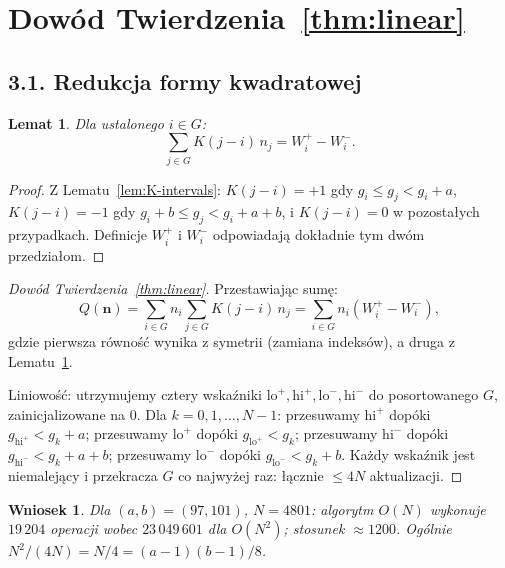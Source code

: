 \documentclass[11pt,a4paper]{amsart}
\theoremstyle{plain}
\newtheorem{lemma}[theorem]{Lemat}
\newtheorem{corollary}[theorem]{Wniosek}
\theoremstyle{definition}
\theoremstyle{remark}
\begin{document}
\section{Dowód Twierdzenia~\ref{thm:linear}}
\label{sec:proof-linear}

\subsection*{3.1. Redukcja formy kwadratowej}

\begin{lemma}
\label{lem:inner-sum}
Dla ustalonego $i \in G$:
\[
  \sum_{j \in G} K(j - i)\, n_j = W^+_i - W^-_i.
\]
\end{lemma}

\begin{proof}
Z Lematu~\ref{lem:K-intervals}: $K(j - i) = +1$ gdy
$g_i \leq g_j < g_i + a$, $K(j-i) = -1$ gdy
$g_i + b \leq g_j < g_i + a + b$, i $K(j-i) = 0$ w pozostałych
przypadkach. Definicje $W^+_i$ i $W^-_i$ odpowiadają dokładnie
tym dwóm przedziałom.
\end{proof}

\begin{proof}[Dowód Twierdzenia~\ref{thm:linear}]
Przestawiając sumę:
\[
  Q(\mathbf{n}) = \sum_{i \in G} n_i \sum_{j \in G} K(j-i)\,n_j
  = \sum_{i \in G} n_i (W^+_i - W^-_i),
\]
gdzie pierwsza równość wynika z symetrii (zamiana indeksów),
a druga z Lematu~\ref{lem:inner-sum}.

Liniowość: utrzymujemy cztery wskaźniki
$\mathrm{lo}^+, \mathrm{hi}^+, \mathrm{lo}^-, \mathrm{hi}^-$
do posortowanego $G$, zainicjalizowane na $0$.
Dla $k = 0, 1, \ldots, N-1$:
przesuwamy $\mathrm{hi}^+$ dopóki $g_{\mathrm{hi}^+} < g_k + a$;
przesuwamy $\mathrm{lo}^+$ dopóki $g_{\mathrm{lo}^+} < g_k$;
przesuwamy $\mathrm{hi}^-$ dopóki $g_{\mathrm{hi}^-} < g_k + a + b$;
przesuwamy $\mathrm{lo}^-$ dopóki $g_{\mathrm{lo}^-} < g_k + b$.
Każdy wskaźnik jest niemalejący i przekracza $G$ co najwyżej raz:
łącznie $\leq 4N$ aktualizacji.
\end{proof}

\begin{corollary}
\label{cor:speedup}
Dla $(a, b) = (97, 101)$, $N = 4801$: algorytm $O(N)$ wykonuje
$19\,204$ operacji wobec $23\,049\,601$ dla $O(N^2)$;
stosunek $\approx 1200$.
Ogólnie $N^2 / (4N) = N/4 = (a-1)(b-1)/8$.
\end{corollary}
\end{document}
